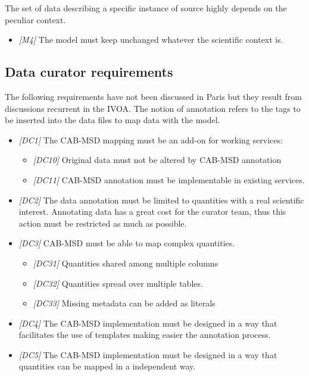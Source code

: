 \documentclass[11pt,a4paper]{ivoa}
\begin{document}
The set of data describing a specific instance of source highly depends on the peculiar context.
\begin{itemize}
    \item \textit{[M4]} The model must keep unchanged whatever the scientific context is.
\end{itemize}


\subsection{Data curator requirements}
The following requirements have not been discussed in Paris but they result from discussions recurrent in the IVOA.
The notion of annotation refers to the tags to be inserted into the data files to map data with the model.
\begin{itemize}
    \item \textit{[DC1]} The CAB-MSD mapping must be an add-on for working services:
    \begin{itemize}
        \item \textit{[DC10]} Original data must not be altered by CAB-MSD annotation
        \item \textit{[DC11]} CAB-MSD annotation must be implementable in existing services.
    \end{itemize}
\end{itemize}
\begin{itemize}
    \item \textit{[DC2]} The data annotation must be limited to quantities with a real scientific interest. Annotating data has a great cost for the curator team, thus this action must be restricted as much as possible.
\end{itemize}
\begin{itemize}
    \item \textit{[DC3]} CAB-MSD must be able to map complex quantities.
    \begin{itemize}
        \item \textit{[DC31]} Quantities shared among multiple columns
        \item \textit{[DC32]} Quantities spread over multiple tables.
        \item \textit{[DC33]} Missing metadata can be added as literals
    \end{itemize}
\end{itemize}
\begin{itemize}
    \item \textit{[DC4]} The CAB-MSD implementation must be designed in a way that facilitates the use of templates making easier the annotation process.
    \item \textit{[DC5]} The CAB-MSD implementation must be designed in a way that quantities can be mapped in a independent way.
\end{itemize}
\end{document}
